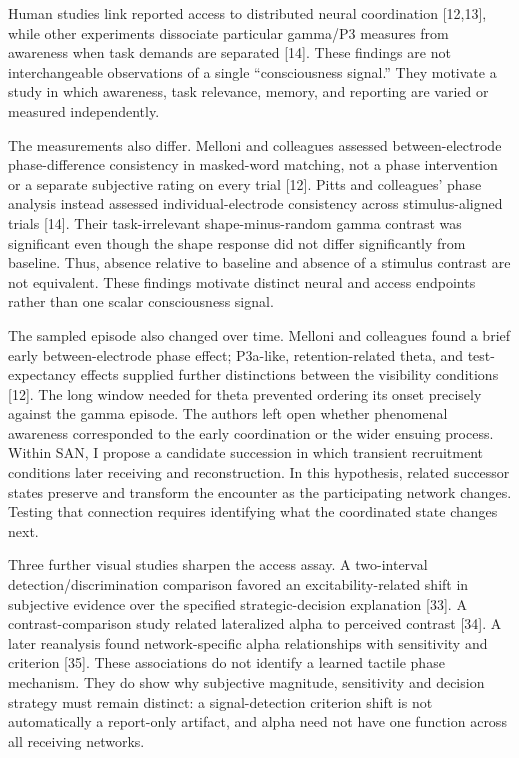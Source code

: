\documentclass[
  american,
  11pt,
  letterpaper,
]{article}
\begin{document}
Human studies link reported access to distributed neural coordination {[}12,13{]}, while other experiments dissociate particular gamma/P3 measures from awareness when task demands are separated {[}14{]}. These findings are not interchangeable observations of a single ``consciousness signal.'' They motivate a study in which awareness, task relevance, memory, and reporting are varied or measured independently.

The measurements also differ. Melloni and colleagues assessed between-electrode phase-difference consistency in masked-word matching, not a phase intervention or a separate subjective rating on every trial {[}12{]}. Pitts and colleagues' phase analysis instead assessed individual-electrode consistency across stimulus-aligned trials {[}14{]}. Their task-irrelevant shape-minus-random gamma contrast was significant even though the shape response did not differ significantly from baseline. Thus, absence relative to baseline and absence of a stimulus contrast are not equivalent. These findings motivate distinct neural and access endpoints rather than one scalar consciousness signal.

The sampled episode also changed over time. Melloni and colleagues found a brief early between-electrode phase effect; P3a-like, retention-related theta, and test-expectancy effects supplied further distinctions between the visibility conditions {[}12{]}. The long window needed for theta prevented ordering its onset precisely against the gamma episode. The authors left open whether phenomenal awareness corresponded to the early coordination or the wider ensuing process. Within SAN, I propose a candidate succession in which transient recruitment conditions later receiving and reconstruction. In this hypothesis, related successor states preserve and transform the encounter as the participating network changes. Testing that connection requires identifying what the coordinated state changes next.

Three further visual studies sharpen the access assay. A two-interval detection/discrimination comparison favored an excitability-related shift in subjective evidence over the specified strategic-decision explanation {[}33{]}. A contrast-comparison study related lateralized alpha to perceived contrast {[}34{]}. A later reanalysis found network-specific alpha relationships with sensitivity and criterion {[}35{]}. These associations do not identify a learned tactile phase mechanism. They do show why subjective magnitude, sensitivity and decision strategy must remain distinct: a signal-detection criterion shift is not automatically a report-only artifact, and alpha need not have one function across all receiving networks.
\end{document}
